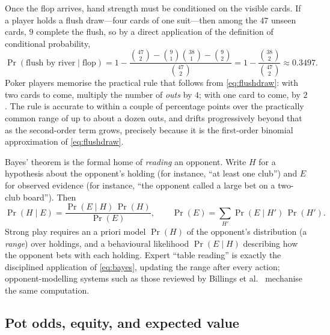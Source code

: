 Once the flop arrives, hand strength must be conditioned on the visible cards. If a player holds a flush draw---four cards of one suit---then among the $47$ unseen cards, $9$ complete the flush, so by a direct application of the definition of conditional probability,
\begin{equation}\label{eq:flushdraw}
\Pr(\text{flush by river} \mid \text{flop}) = 1 - \frac{\binom{47}{2} - \binom{9}{1}\binom{38}{1} - \binom{9}{2}}{\binom{47}{2}} = 1 - \frac{\binom{38}{2}}{\binom{47}{2}} \approx 0.3497 .
\end{equation}
Poker players memorise the practical rule that follows from \eqref{eq:flushdraw}: with two cards to come, multiply the number of \emph{outs} by $4$; with one card to come, by $2$. The rule is accurate to within a couple of percentage points over the practically common range of up to about a dozen outs, and drifts progressively beyond that as the second-order term grows, precisely because it is the first-order binomial approximation of \eqref{eq:flushdraw}.

Bayes' theorem is the formal home of \emph{reading} an opponent. Write $H$ for a hypothesis about the opponent's holding (for instance, ``at least one club'') and $E$ for observed evidence (for instance, ``the opponent called a large bet on a two-club board''). Then
\begin{equation}\label{eq:bayes}
\Pr(H \mid E) = \frac{\Pr(E \mid H)\,\Pr(H)}{\Pr(E)},
\qquad
\Pr(E) = \sum_{H'} \Pr(E \mid H')\,\Pr(H') .
\end{equation}
Strong play requires an a priori model $\Pr(H)$ of the opponent's distribution (a \emph{range}) over holdings, and a behavioural likelihood $\Pr(E \mid H)$ describing how the opponent bets with each holding. Expert ``table reading'' is exactly the disciplined application of \eqref{eq:bayes}, updating the range after every action; opponent-modelling systems such as those reviewed by Billings et al.~\cite{billings2002challenge} mechanise the same computation.

\subsection{Pot odds, equity, and expected value}

